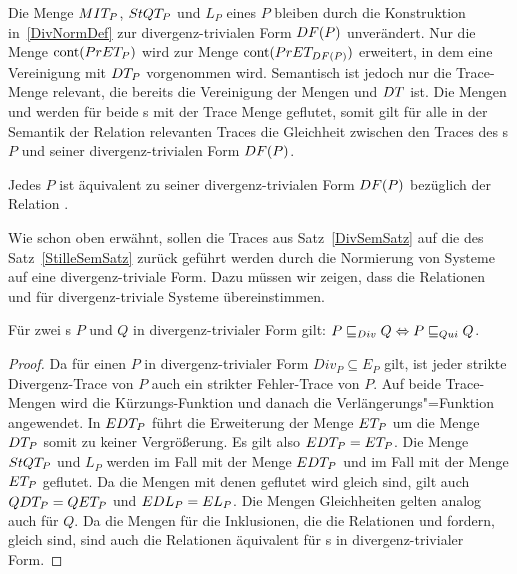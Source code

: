 Die Menge $MIT _P$, $StQT _P$ und $L_P$ eines \MEIO{} $P$ bleiben durch die
Konstruktion in~\ref{DivNormDef} zur divergenz-trivialen Form $DF (P)$
unverändert. Nur die Menge $\mathrm{cont} (PrET _P)$ wird zur Menge $\mathrm{cont} (PrET
_{DF (P)})$ erweitert, in dem eine Vereinigung mit $DT _P$ vorgenommen wird.
Semantisch ist jedoch nur die Trace-Menge \EDT{} relevant, die bereits die
Vereinigung der Mengen \ET{} und $DT{}$ ist. Die Mengen \QDT{} und \EDL{}
werden für beide \MEIO{}s mit der Trace Menge \EDT{} geflutet, somit gilt für
alle in der Semantik der Relation \DRel{} relevanten Traces die Gleichheit
zwischen den Traces des \MEIO{}s $P$ und seiner divergenz-trivialen Form $DF
(P)$.

\begin{Prop}
  \label{DivNormProp}
  Jedes \MEIO{} $P$ ist äquivalent zu seiner divergenz-trivialen Form $DF (P)$
  bezüglich der Relation \DRel{}.
\end{Prop}

Wie schon oben erwähnt, sollen die Traces aus Satz~\ref{DivSemSatz} auf die des
Satz~\ref{StilleSemSatz} zurück geführt werden durch die Normierung von Systeme
auf eine divergenz-triviale Form. Dazu müssen wir zeigen, dass die Relationen
\DRel{} und \QRel{} für divergenz-triviale Systeme übereinstimmen.

\begin{Lem}
  \label{QDRelDivNormLem}
  Für zwei \MEIO{}s $P$ und $Q$ in divergenz-trivialer Form gilt: $P  \sqsubseteq  _{Div} Q
  \Leftrightarrow P  \sqsubseteq  _{Qui} Q$.
\end{Lem}
\begin{proof}
  Da für einen \MEIO{} $P$ in divergenz-trivialer Form $Div _P \subseteq E _P$
  gilt, ist jeder strikte Divergenz-Trace von $P$ auch ein strikter
  Fehler-Trace von $P$. Auf beide Trace-Mengen wird die Kürzungs-Funktion
  \prune{} und danach die Verlängerungs"=Funktion \cont{} angewendet. In $EDT
  _P$ führt die Erweiterung der Menge $ET _P$ um die Menge $DT _P$ somit zu
  keiner Vergrößerung. Es gilt also $EDT _P = ET _P$. Die Menge $StQT _P$
  und $L _P$ werden im Fall \DRel{} mit der Menge $EDT _P$ und im Fall \QRel{}
  mit der Menge $ET _P$ geflutet. Da die Mengen mit denen geflutet wird gleich
  sind, gilt auch $QDT _P = QET _P$ und $EDL _P = EL _P$. Die Mengen
  Gleichheiten gelten analog auch für $Q$. Da die Mengen für die Inklusionen,
  die die Relationen \DRel{} und \QRel{} fordern, gleich sind, sind auch die
  Relationen äquivalent für \MEIO{}s in divergenz-trivialer Form.
\end{proof}

